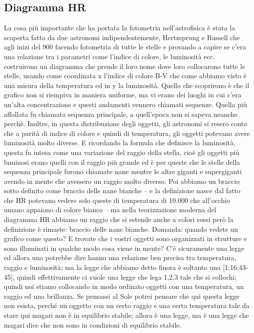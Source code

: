 \documentclass[a4paper,11pt]{article}
\begin{document}
\subsection{Diagramma HR}
La cosa più importante che ha portata la fotometria nell’astrofisica è stata la scoperta fatta da due astronomi indipendentemente, Hertzsprung e Russell che agli inizi del 900 facendo fotometria di tutte le stelle e provando a capire se c’era una relazione tra i parametri come l’indice di colore, le luminosità ecc. costruirono un diagramma che prende il loro nome dove loro collocarono tutte le stelle, usando come coordinata x l’indice di colore B-V che come abbiamo visto è una misura della temperatura ed in y la luminosità. Quello che scoprirono è che il grafico non si riempiva in maniera uniforme, ma vi erano dei luoghi in cui c’era un’alta concentrazione e questi andamenti vennero chiamati sequenze. Quella più affollata fu chiamata sequenza principale, a quell’epoca non si sapeva neanche perchè. Inoltre, in questa distribuzione degli oggetti, gli astronomi si resero conto che a parità di indice di colore e quindi di temperatura, gli oggetti potevano avere luminosità molto diverse. E ricordando la formula che definisce la luminosità, questa fu intesa come una variazione del raggio della stella, cioè gli oggetti più luminosi erano quelli con il raggio più grande ed è per queste che le stelle della sequenza principale furono chiamate nane mentre le altre giganti e supergiganti avendo in mente che avessero un raggio molto diverso. Poi abbiamo un braccio sotto definito come braccio delle nane bianche – e la definizione nasce dal fatto che HR potevano vedere solo queste di temperatura di 10.000  che all’occhio umano appaiono di colore bianco – ma nella teorizzazione moderna del diagramma HR abbiamo un raggio che si estende anche a colori rossi però la definizione è rimaste: braccio delle nane bianche. Domanda: quando vedete un grafico come questo? E trovate che i vostri oggetti sono organizzati in strutture e sono illuminati in qualche modo cosa viene in mente? C’è sicuramente una legge ed allora uno potrebbe dire hanno una relazione ben precisa tra temperatura, raggio e luminosità; ma la legge che abbiamo detto finora è soltanto una [1:16:43-45], quindi effettivamente ci vuole una legge che lega 1,2,3 tale che si collochi; quindi noi stiamo collocando in modo ordinato oggetti con una temperatura, un raggio ed una brillanza. Se pensassi al Sole potrei pensare che qui questa legge non esista, perché un oggetto con un certo raggio e una certa temperatura tale da stare qui magari non è in equilibrio stabile; allora è una legge, ma è una legge che magari dice che non sono in condizioni di equilibrio stabile. 
\end{document}
